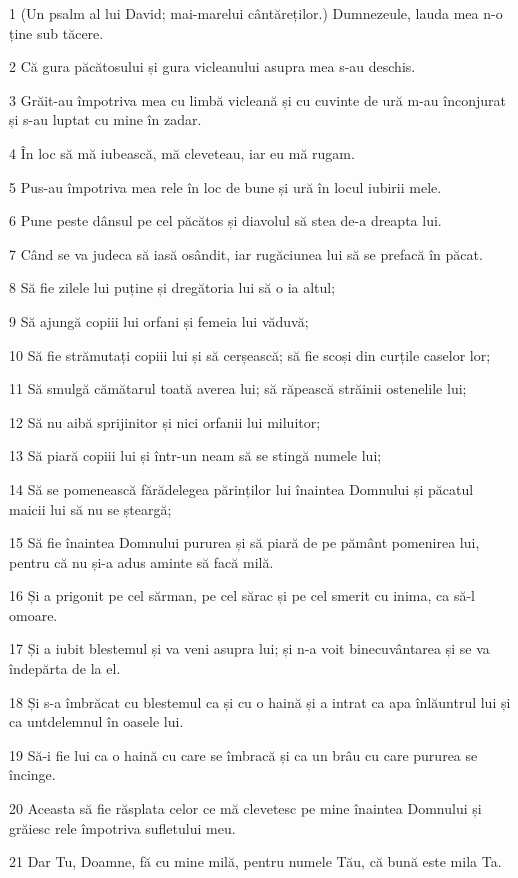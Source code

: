 \par 1 (Un psalm al lui David; mai-marelui cântăreților.) Dumnezeule, lauda mea n-o ține sub tăcere.
\par 2 Că gura păcătosului și gura vicleanului asupra mea s-au deschis.
\par 3 Grăit-au împotriva mea cu limbă vicleană și cu cuvinte de ură m-au înconjurat și s-au luptat cu mine în zadar.
\par 4 În loc să mă iubească, mă cleveteau, iar eu mă rugam.
\par 5 Pus-au împotriva mea rele în loc de bune și ură în locul iubirii mele.
\par 6 Pune peste dânsul pe cel păcătos și diavolul să stea de-a dreapta lui.
\par 7 Când se va judeca să iasă osândit, iar rugăciunea lui să se prefacă în păcat.
\par 8 Să fie zilele lui puține și dregătoria lui să o ia altul;
\par 9 Să ajungă copiii lui orfani și femeia lui văduvă;
\par 10 Să fie strămutați copiii lui și să cerșească; să fie scoși din curțile caselor lor;
\par 11 Să smulgă cămătarul toată averea lui; să răpească străinii ostenelile lui;
\par 12 Să nu aibă sprijinitor și nici orfanii lui miluitor;
\par 13 Să piară copiii lui și într-un neam să se stingă numele lui;
\par 14 Să se pomenească fărădelegea părinților lui înaintea Domnului și păcatul maicii lui să nu se șteargă;
\par 15 Să fie înaintea Domnului pururea și să piară de pe pământ pomenirea lui, pentru că nu și-a adus aminte să facă milă.
\par 16 Și a prigonit pe cel sărman, pe cel sărac și pe cel smerit cu inima, ca să-l omoare.
\par 17 Și a iubit blestemul și va veni asupra lui; și n-a voit binecuvântarea și se va îndepărta de la el.
\par 18 Și s-a îmbrăcat cu blestemul ca și cu o haină și a intrat ca apa înlăuntrul lui și ca untdelemnul în oasele lui.
\par 19 Să-i fie lui ca o haină cu care se îmbracă și ca un brâu cu care pururea se încinge.
\par 20 Aceasta să fie răsplata celor ce mă clevetesc pe mine înaintea Domnului și grăiesc rele împotriva sufletului meu.
\par 21 Dar Tu, Doamne, fă cu mine milă, pentru numele Tău, că bună este mila Ta.

